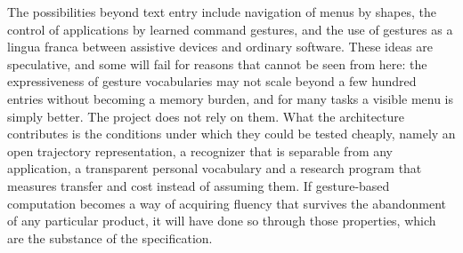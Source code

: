 The possibilities beyond text entry include navigation of menus by shapes, the control of applications by learned command gestures, and the use of gestures as a lingua franca between assistive devices and ordinary software. These ideas are speculative, and some will fail for reasons that cannot be seen from here: the expressiveness of gesture vocabularies may not scale beyond a few hundred entries without becoming a memory burden, and for many tasks a visible menu is simply better. The project does not rely on them. What the architecture contributes is the conditions under which they could be tested cheaply, namely an open trajectory representation, a recognizer that is separable from any application, a transparent personal vocabulary and a research program that measures transfer and cost instead of assuming them. If gesture-based computation becomes a way of acquiring fluency that survives the abandonment of any particular product, it will have done so through those properties, which are the substance of the specification.\evS
